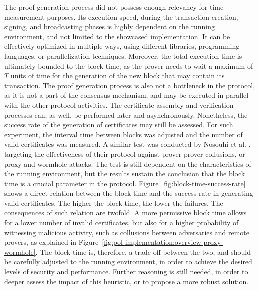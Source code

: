 The proof generation process did not possess enough relevancy for time measurement purposes. Its execution speed, during the transaction creation, signing, and broadcasting phases is highly dependent on the running environment, and not limited to the showcased implementation. It can be effectively optimized in multiple ways, using different libraries, programming languages, or parallelization techniques. Moreover, the total execution time is ultimately bounded to the block time, as the prover needs to wait a maximum of $T$ units of time for the generation of the new block that may contain its transaction. The proof generation process is also not a bottleneck in the protocol, as it is not a part of the consensus mechanism, and may be executed in parallel with the other protocol activities. The certificate assembly and verification processes can, as well, be performed later and asynchronously. Nonetheless, the success rate of the generation of \pol{} certificates may still be assessed. For such experiment, the interval time between blocks was adjusted and the number of valid \pol{} certificates was measured. A similar test was conducted by Nosouhi et al. \cite{nosouhi2020blockchain}, targeting the effectiveness of their protocol against prover-prover collusions, or proxy and wormhole attacks. The test is still dependent on the characteristics of the running environment, but the results sustain the conclusion that the block time is a crucial parameter in the protocol. Figure~\ref{fig:block-time-success-rate} shows a direct relation between the block time and the success rate in generating valid certificates. The higher the block time, the lower the failures. The consequences of such relation are twofold. A more permissive block time allows for a lower number of invalid certificates, but also for a higher probability of witnessing malicious activity, such as collusions between adversaries and remote provers, as explained in Figure~\ref{fig:pol-implementation:overview-proxy-wormhole}. The block time is, therefore, a trade-off between the two, and should be carefully adjusted to the running environment, in order to achieve the desired levels of security and performance. Further reasoning is still needed, in order to deeper assess the impact of this heuristic, or to propose a more robust solution.

